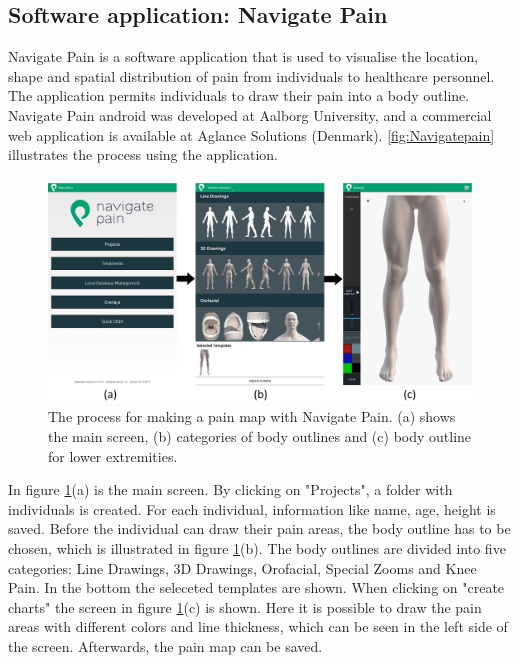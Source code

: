 \subsection{Software application: Navigate Pain} \label{sec:nav}
Navigate Pain is a software application that is used to visualise the location, shape and spatial distribution of pain from individuals to healthcare personnel. The application permits individuals to draw their pain into a body outline. Navigate Pain android was developed at Aalborg University, and a commercial web application is available at Aglance Solutions (Denmark).\citep{Solutions2015}
\autoref{fig:Navigatepain} illustrates the process using the application.

\begin{figure} [H]
\centering
\includegraphics[width=1\textwidth]{figures/Navigatepain}
\caption{The process for making a pain map with Navigate Pain. (a) shows the main screen, (b) categories of body outlines and (c) body outline for lower extremities.}
\label{fig:Navigatepain}
\end{figure}

\noindent
In figure \ref{fig:Navigatepain}(a) is the main screen. By clicking on "Projects", a folder with individuals is created. For each individual, information like name, age, height is saved. Before the individual can draw their pain areas, the body outline has to be chosen, which is illustrated in figure \ref{fig:Navigatepain}(b). The body outlines are divided into five categories: Line Drawings, 3D Drawings, Orofacial, Special Zooms and Knee Pain. In the bottom the seleceted templates are shown. When clicking on "create charts" the screen in figure \ref{fig:Navigatepain}(c) is shown. Here it is possible to draw the pain areas with different colors and line thickness, which can be seen in the left side of the screen. Afterwards, the pain map can be saved.



